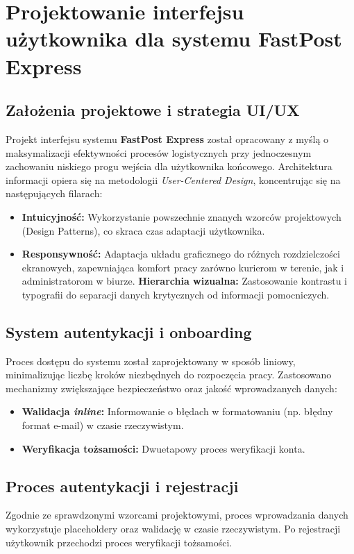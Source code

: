 
\chapter{Projektowanie interfejsu użytkownika dla systemu FastPost Express}

\section{Założenia projektowe i strategia UI/UX}
Projekt interfejsu systemu \textbf{FastPost Express} został opracowany z myślą o maksymalizacji efektywności procesów logistycznych przy jednoczesnym zachowaniu niskiego progu wejścia dla użytkownika końcowego. Architektura informacji opiera się na metodologii \textit{User-Centered Design}, koncentrując się na następujących filarach:

\begin{itemize}
    \item \textbf{Intuicyjność:} Wykorzystanie powszechnie znanych wzorców projektowych (Design Patterns), co skraca czas adaptacji użytkownika.
    \item \textbf{Responsywność:} Adaptacja układu graficznego do różnych rozdzielczości ekranowych, zapewniająca komfort pracy zarówno kurierom w terenie, jak i administratorom w biurze.
    \textbf{Hierarchia wizualna:} Zastosowanie kontrastu i typografii do separacji danych krytycznych od informacji pomocniczych.
\end{itemize}

\section{System autentykacji i onboarding}
Proces dostępu do systemu został zaprojektowany w sposób liniowy, minimalizując liczbę kroków niezbędnych do rozpoczęcia pracy. Zastosowano mechanizmy zwiększające bezpieczeństwo oraz jakość wprowadzanych danych:

\begin{itemize}
    \item \textbf{Walidacja \textit{inline}:} Informowanie o błędach w formatowaniu (np. błędny format e-mail) w czasie rzeczywistym.
    \item \textbf{Weryfikacja tożsamości:} Dwuetapowy proces weryfikacji konta.
\end{itemize}

\section{Proces autentykacji i rejestracji}
Zgodnie ze sprawdzonymi wzorcami projektowymi, proces wprowadzania danych wykorzystuje placeholdery oraz walidację w czasie rzeczywistym. Po rejestracji użytkownik przechodzi proces weryfikacji tożsamości.

